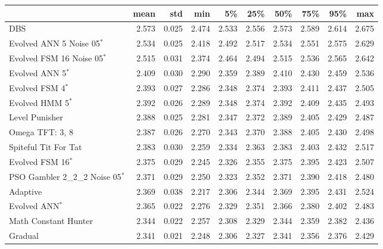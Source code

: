 \begin{tabular}{lrrrrrrrrr}
\toprule
{} &   mean &    std &    min &     5\% &    25\% &    50\% &    75\% &    95\% &    max \\
\midrule
DBS                              &  2.573 &  0.025 &  2.474 &  2.533 &  2.556 &  2.573 &  2.589 &  2.614 &  2.675 \\
Evolved ANN 5 Noise 05$^{*}$     &  2.534 &  0.025 &  2.418 &  2.492 &  2.517 &  2.534 &  2.551 &  2.575 &  2.629 \\
Evolved FSM 16 Noise 05$^{*}$    &  2.515 &  0.031 &  2.374 &  2.464 &  2.494 &  2.515 &  2.536 &  2.565 &  2.642 \\
Evolved ANN 5$^{*}$              &  2.409 &  0.030 &  2.290 &  2.359 &  2.389 &  2.410 &  2.430 &  2.459 &  2.536 \\
Evolved FSM 4$^{*}$              &  2.393 &  0.027 &  2.286 &  2.348 &  2.374 &  2.393 &  2.411 &  2.437 &  2.505 \\
Evolved HMM 5$^{*}$              &  2.392 &  0.026 &  2.289 &  2.348 &  2.374 &  2.392 &  2.409 &  2.435 &  2.493 \\
Level Punisher                   &  2.388 &  0.025 &  2.281 &  2.347 &  2.372 &  2.389 &  2.405 &  2.429 &  2.487 \\
Omega TFT: 3, 8                  &  2.387 &  0.026 &  2.270 &  2.343 &  2.370 &  2.388 &  2.405 &  2.430 &  2.498 \\
Spiteful Tit For Tat             &  2.383 &  0.030 &  2.259 &  2.334 &  2.363 &  2.383 &  2.403 &  2.432 &  2.517 \\
Evolved FSM 16$^{*}$             &  2.375 &  0.029 &  2.245 &  2.326 &  2.355 &  2.375 &  2.395 &  2.423 &  2.507 \\
PSO Gambler 2\_2\_2 Noise 05$^{*}$ &  2.371 &  0.029 &  2.250 &  2.323 &  2.352 &  2.371 &  2.390 &  2.418 &  2.480 \\
Adaptive                         &  2.369 &  0.038 &  2.217 &  2.306 &  2.344 &  2.369 &  2.395 &  2.431 &  2.524 \\
Evolved ANN$^{*}$                &  2.365 &  0.022 &  2.276 &  2.329 &  2.351 &  2.366 &  2.380 &  2.402 &  2.483 \\
Math Constant Hunter             &  2.344 &  0.022 &  2.257 &  2.308 &  2.329 &  2.344 &  2.359 &  2.382 &  2.436 \\
Gradual                          &  2.341 &  0.021 &  2.248 &  2.306 &  2.327 &  2.341 &  2.356 &  2.376 &  2.429 \\
\bottomrule
\end{tabular}
